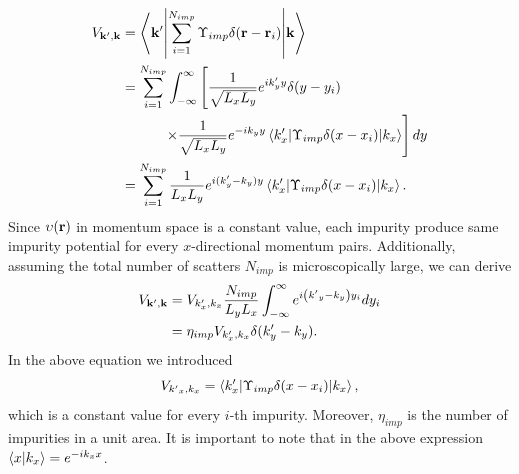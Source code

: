 \documentclass[
 reprint,
 amsmath,amssymb,
 aps,
 prb,
]{revtex4-2}
\begin{document}
\begin{appendix}
\begin{subequations} \label{eq:c24}
\begin{align}
 V_{\vb{k'},\vb{k}} & =
 \mel**{\vb{k'}}{\sum_{i=1}^{N_{imp}}
 \Upsilon_{imp} \delta(\vb{r}-\vb{r}_i)}{\vb{k}} \label{eq:c24a} \\
 & =
 \sum_{i=1}^{N_{imp}}
 \int_{-\infty}^{\infty} \left[
 \frac{1}{\sqrt{L_xL_y}} e^{ik'_y y} \delta(y-y_i) \nonumber \right. \\
 & \left. \qquad\quad\times
 \frac{1}{\sqrt{L_xL_y}} e^{-i{k}_y y}
 \mel**{k'_x}{\Upsilon_{imp} \delta(x-x_i)}{k_x} \right] dy \label{eq:c24b} \\
  & =
 \sum_{i=1}^{N_{imp}} \frac{1}{{L_xL_y}}
 e^{i(k'_y - k_y )y}
 \mel**{k'_x}{\Upsilon_{imp} \delta(x-x_i)}{k_x} \label{eq:c24c}.
\end{align}
\end{subequations}
Since $\upsilon (\vb{r})$ in momentum space is a constant value, each impurity  produce same impurity potential for every $x$-directional momentum pairs. Additionally, assuming the total number of scatters $N_{imp}$ is microscopically large, we can derive
\begin{subequations} \label{eq:c25}
  \begin{align}
    V_{\vb{k'},\vb{k}}
    & =
    V_{k'_x,k_x}
    \frac{N_{imp}}{L_y L_x} \int_{-\infty}^{\infty}
    e^{i\left({k'}_y - k_y \right)y_i} dy_i \label{eq:c25a} \\
    & =
    \eta_{imp} V_{k'_x,k_x} \delta(k'_y - k_y). \label{eq:c25b}
  \end{align}
\end{subequations}
In the above equation we introduced
\begin{equation} \label{eq:c26}
  V_{{k'}_x,k_x} =
  \mel**{k'_x}{\Upsilon_{imp} \delta(x-x_i)}{k_x},
\end{equation}
which is a constant value for every $i$-th impurity. Moreover, $\eta_{imp}$ is the number of impurities in a unit area. It is important to note that in the above expression $\braket{x}{k_x} = e^{-ik_xx}$.


\end{appendix}
\end{document}
